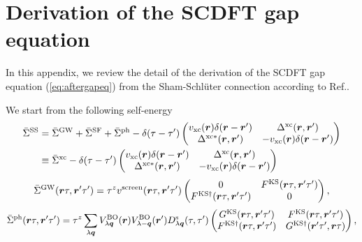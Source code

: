 

%
%
\appendix
\chapter{Derivation of the SCDFT gap equation}
\label{appdx:gapeq}
In this appendix, we review the detail of the derivation of the SCDFT gap equation
(\ref{eq:aftergapeq}) from the Sham-Schl\"{u}ter connection according to Ref.\cite{MarquesphD}.

We start from the following self-energy
%
\begin{equation}
	\begin{split}
	\bar{\Sigma}^{\rm SS} &= \bar{\Sigma}^{\rm GW} + \bar{\Sigma}^{\rm SF} + \bar{\Sigma}^{\rm ph}
	-\delta(\tau - \tau') 
	\begin{pmatrix}
		 v_{\rm xc}(\bm r)\delta(\bm r - \bm r')  &   \Delta^{\rm xc}(\bm r, \bm r')   \\
		 \Delta^{\rm xc\ast}(\bm r, \bm r')  & - v_{\rm xc}(\bm r)\delta(\bm r - \bm r')
	\end{pmatrix} \\
	& \equiv \bar{\Sigma}^{\rm xc} - \delta(\tau - \tau')
	\begin{pmatrix}
		 v_{\rm xc}(\bm r)\delta(\bm r - \bm r')  &   \Delta^{\rm xc}(\bm r, \bm r')   \\
		 \Delta^{\rm xc\ast}(\bm r, \bm r')  & - v_{\rm xc}(\bm r)\delta(\bm r - \bm r')
	\end{pmatrix} \\
	\label{eq:appSSself}
\end{split}
\end{equation}
%
\begin{equation}
	\bar{\Sigma}^{\rm GW}(\bm r \tau, \bm r' \tau') = \tau^z v^{\rm screen}(\bm r \tau, \bm r' \tau')
	\begin{pmatrix}
		0  &   F^{\rm KS}(\bm r \tau, \bm r' \tau')   \\
		F^{\rm KS\dag}(\bm r \tau, \bm r' \tau')  & 0
	\end{pmatrix},
	\label{eq:GWself}
\end{equation}
%
\begin{equation}
	\bar{\Sigma}^{\rm ph}(\bm r \tau, \bm r' \tau') = \tau^z \sum_{\lambda \bm q}
	V^{\rm BO}_{\lambda \bm q}(\bm r)V^{\rm BO}_{\lambda -\bm q}(\bm r') D^{\rm s}_{\lambda\bm q}(\tau, \tau')
	\begin{pmatrix}
		G^{\rm KS}(\bm r \tau, \bm r' \tau')  &   F^{\rm KS}(\bm r \tau, \bm r' \tau')   \\
		F^{\rm KS\dag}(\bm r \tau, \bm r' \tau')  & G^{\rm KS\dag}(\bm r' \tau', \bm r \tau)
	\end{pmatrix},
	\label{eq:phself}
\end{equation}
